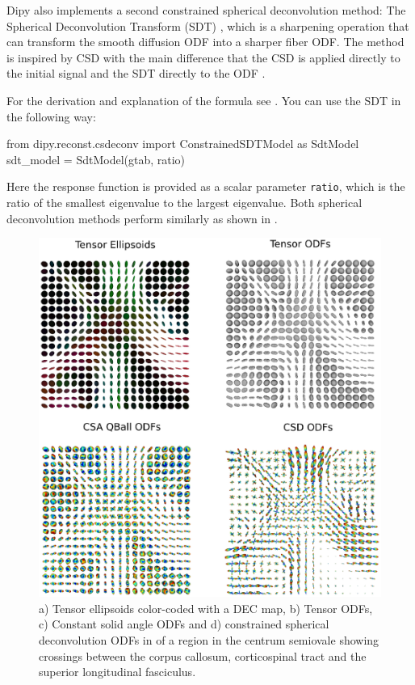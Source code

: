\documentclass{bioinfo}
\begin{document}
Dipy also implements a second constrained spherical deconvolution method: The
Spherical Deconvolution Transform (SDT)
\citep{descoteaux-deriche-etal:09}, which is a sharpening
operation that can transform the smooth diffusion ODF into a sharper
fiber ODF. The method is
inspired by CSD \cite{tournier-calamante-etal:07} with the main difference
that the CSD is applied directly to the initial signal and the SDT directly to
the ODF \citep{descoteaux:08,descoteaux-deriche-etal:09}.

For the derivation and explanation of the formula see \cite{descoteaux-deriche-etal:09}. You can use the SDT in the following way:
\begin{python}
from dipy.reconst.csdeconv import
                  ConstrainedSDTModel as SdtModel
sdt_model = SdtModel(gtab, ratio)
\end{python}
Here the response function is provided as a scalar parameter \texttt{ratio},
which is the ratio of the
smallest eigenvalue to the largest eigenvalue. Both spherical deconvolution
methods perform similarly as shown in
\citep{descoteaux-deriche-etal:09,GaryfallidisISBI2013a}.

\begin{figure}[!htb]
\centerline{\includegraphics[width=180mm]{Figures/ten_csa_csd2.eps}}
\caption{a) Tensor ellipsoids color-coded with a DEC map, b) Tensor
  ODFs, c) Constant solid angle ODFs and d) constrained spherical deconvolution
  ODFs in of a region in the centrum semiovale showing crossings between the
  corpus callosum, corticospinal tract and the superior longitudinal fasciculus.
\label{Fig:ten_csa_csd}}
\end{figure}
\end{document}
